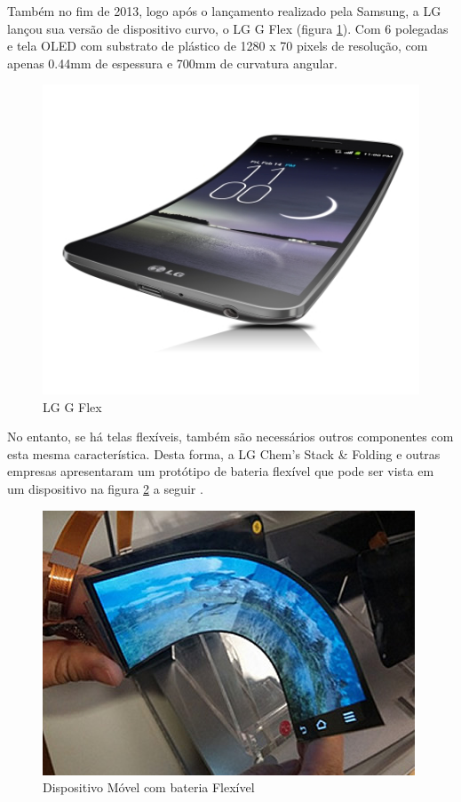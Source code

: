 Também no fim de 2013, logo após o lançamento realizado pela Samsung, a LG lançou sua versão de dispositivo curvo, o LG G Flex (figura \ref{fig:g-flex}). Com 6 polegadas e tela OLED com substrato de plástico de 1280 x 70 pixels de resolução, com apenas 0.44mm de espessura e 700mm de curvatura angular.

\begin{figure}[!ht]
  \centering
  \includegraphics[width=.60\textwidth]{./figuras/g-flex} 
  \caption{LG G Flex}
  \label{fig:g-flex} 
\end{figure}

No entanto, se há telas flexíveis, também são necessários outros componentes com esta mesma característica. Desta forma, a LG Chem’s Stack \& Folding e outras empresas apresentaram um protótipo de bateria flexível que pode ser vista em um dispositivo na figura \ref{fig:flexible-battery} a seguir \cite{NOLEDDN}.\\

\begin{figure}[!ht]
  \centering
  \includegraphics[width=.60\textwidth]{./figuras/flexible-battery} 
  \caption{Dispositivo Móvel com bateria Flexível}
  \label{fig:flexible-battery} 
\end{figure}


